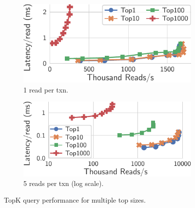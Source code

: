 \documentclass[sigplan,twocolumn,review,anonymous]{acmart}
\begin{document}
\begin{figure}
	\centering
	\begin{subfigure}{.471\linewidth}
		\includegraphics[width=1\linewidth]{singleQuery/bench_top_size_0_upd}
	\vspace*{-10pt}
			\caption{1 read per txn.}
		\label{fig:topSize_single}
	\end{subfigure}%
	\hspace*{0.2em}
	\begin{subfigure}{.509\linewidth}
		\includegraphics[width=1\linewidth]{singleQuery/bench_top_size_0_upd_5b}
	\vspace*{-10pt}
		\caption{5 reads per txn (log scale).}
		\label{fig:topSize_batch}
	\end{subfigure}%
	\vspace*{-10pt}
	\caption{TopK query performance for multiple top sizes.}
	\label{fig:topSize}
	\vspace*{-10pt} %
\end{figure}

\end{document}
